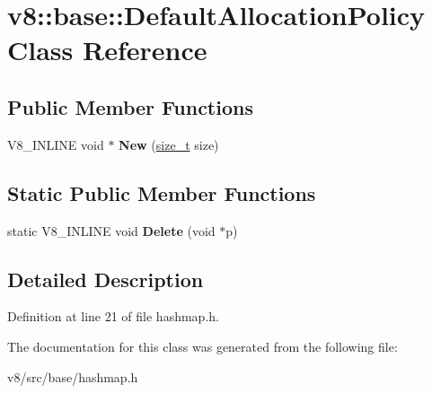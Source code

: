 \hypertarget{classv8_1_1base_1_1DefaultAllocationPolicy}{}\section{v8\+:\+:base\+:\+:Default\+Allocation\+Policy Class Reference}
\label{classv8_1_1base_1_1DefaultAllocationPolicy}
\subsection*{Public Member Functions}
\begin{DoxyCompactItemize}
\item 
\mbox{\label{classv8_1_1base_1_1DefaultAllocationPolicy_ac20497a950e3d8d7dd2b8ee14fe1ba1e}} 
V8\+\_\+\+I\+N\+L\+I\+NE void $\ast$ {\bfseries New} (\mbox{\hyperlink{classsize__t}{size\+\_\+t}} size)
\end{DoxyCompactItemize}
\subsection*{Static Public Member Functions}
\begin{DoxyCompactItemize}
\item 
\mbox{\label{classv8_1_1base_1_1DefaultAllocationPolicy_a6f76f371f2cc27b20bbff55517470c37}} 
static V8\+\_\+\+I\+N\+L\+I\+NE void {\bfseries Delete} (void $\ast$p)
\end{DoxyCompactItemize}


\subsection{Detailed Description}


Definition at line 21 of file hashmap.\+h.



The documentation for this class was generated from the following file\+:\begin{DoxyCompactItemize}
\item 
v8/src/base/hashmap.\+h\end{DoxyCompactItemize}
